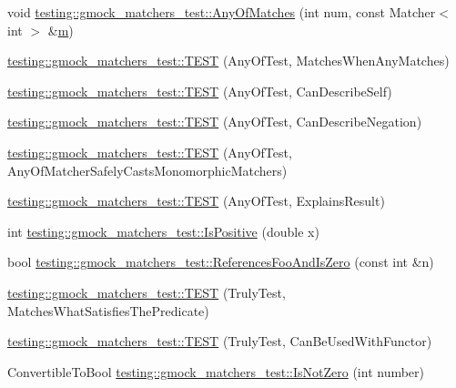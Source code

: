 \begin{DoxyCompactItemize}
void \hyperlink{namespacetesting_1_1gmock__matchers__test_aa4e9deb0a98413e62516451e7c060c7a}{testing\+::gmock\+\_\+matchers\+\_\+test\+::\+Any\+Of\+Matches} (int num, const Matcher$<$ int $>$ \&\hyperlink{variables__e_8js_aab4247b6acebcba996939b177f483c14}{m})
\item 
\hyperlink{namespacetesting_1_1gmock__matchers__test_a4949d40a1ac77182274189c21848af00}{testing\+::gmock\+\_\+matchers\+\_\+test\+::\+T\+E\+ST} (Any\+Of\+Test, Matches\+When\+Any\+Matches)
\item 
\hyperlink{namespacetesting_1_1gmock__matchers__test_a00bd490bf974b3f3485a1b0fde9fa490}{testing\+::gmock\+\_\+matchers\+\_\+test\+::\+T\+E\+ST} (Any\+Of\+Test, Can\+Describe\+Self)
\item 
\hyperlink{namespacetesting_1_1gmock__matchers__test_acc5e849e0765f00a48581e9480f3c8e2}{testing\+::gmock\+\_\+matchers\+\_\+test\+::\+T\+E\+ST} (Any\+Of\+Test, Can\+Describe\+Negation)
\item 
\hyperlink{namespacetesting_1_1gmock__matchers__test_a8fb1598253450afeb0440682cd23999e}{testing\+::gmock\+\_\+matchers\+\_\+test\+::\+T\+E\+ST} (Any\+Of\+Test, Any\+Of\+Matcher\+Safely\+Casts\+Monomorphic\+Matchers)
\item 
\hyperlink{namespacetesting_1_1gmock__matchers__test_ad4c09014fce6029575e2c337cde85bdf}{testing\+::gmock\+\_\+matchers\+\_\+test\+::\+T\+E\+ST} (Any\+Of\+Test, Explains\+Result)
\item 
int \hyperlink{namespacetesting_1_1gmock__matchers__test_a70e728cf67d0224c3ebb9eb8959cc39d}{testing\+::gmock\+\_\+matchers\+\_\+test\+::\+Is\+Positive} (double x)
\item 
bool \hyperlink{namespacetesting_1_1gmock__matchers__test_abdce9daf2e3d3721d68f76680129f03b}{testing\+::gmock\+\_\+matchers\+\_\+test\+::\+References\+Foo\+And\+Is\+Zero} (const int \&n)
\item 
\hyperlink{namespacetesting_1_1gmock__matchers__test_ab7761562a8ffea67a485f3f649f6430a}{testing\+::gmock\+\_\+matchers\+\_\+test\+::\+T\+E\+ST} (Truly\+Test, Matches\+What\+Satisfies\+The\+Predicate)
\item 
\hyperlink{namespacetesting_1_1gmock__matchers__test_ab3e259f3ae45e199474d7c6d554852f0}{testing\+::gmock\+\_\+matchers\+\_\+test\+::\+T\+E\+ST} (Truly\+Test, Can\+Be\+Used\+With\+Functor)
\item 
Convertible\+To\+Bool \hyperlink{namespacetesting_1_1gmock__matchers__test_a248045bc57c8bad87b7d185b5c292f60}{testing\+::gmock\+\_\+matchers\+\_\+test\+::\+Is\+Not\+Zero} (int number)

\end{DoxyCompactItemize}
